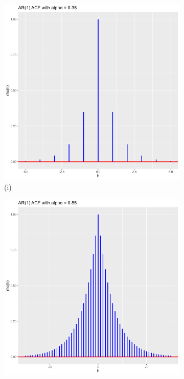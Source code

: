 \documentclass[11pt, a4paper]{article}
\begin{document}
\begin{figure}[h!]
  \centering
  \begin{subfigure}[t]{0.3\textwidth}
    \includegraphics[width=\linewidth]{alpha_0.35.png}
    \caption*{(i)}
  \end{subfigure}
  \hfill
  \begin{subfigure}[t]{0.3\textwidth}
    \includegraphics[width=\linewidth]{alpha_0.85.png}

\end{subfigure}
\end{figure}
\end{document}
